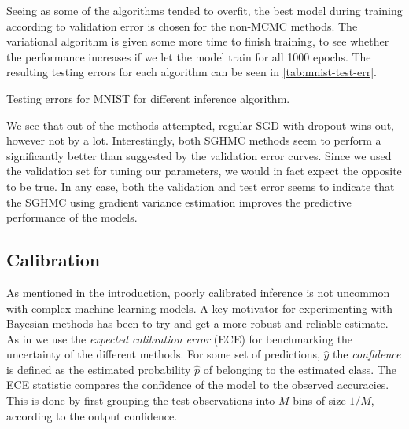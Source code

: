 Seeing as some of the algorithms tended to overfit, the best model during training according to validation error is chosen for the non-MCMC methods.
The variational algorithm is given some more time to finish training, to see whether the performance increases if we let the model train for all 1000 epochs. 
The resulting testing errors for each algorithm can be seen in \cref{tab:mnist-test-err}.
\begin{table}[htbp]
    \centering
    
    \caption{Testing errors for MNIST for different inference algorithm.}
    \label{tab:mnist-test-err}
\end{table}
We see that out of the methods attempted, regular SGD with dropout wins out, however not by a lot. 
Interestingly, both SGHMC methods seem to perform a significantly better than suggested by the validation error curves. 
Since we used the validation set for tuning our parameters, we would in fact expect the opposite to be true. 
In any case, both the validation and test error seems to indicate that the SGHMC using gradient variance estimation improves the predictive performance of the models.

\subsection{Calibration}

As mentioned in the introduction, poorly calibrated inference is not uncommon with complex machine learning models. 
A key motivator for experimenting with Bayesian methods has been to try and get a more robust and reliable estimate.
As in \cite{guo_calibration_2017} we use the \emph{expected calibration error} (ECE) for benchmarking the uncertainty of the different methods.
For some set of predictions, $\hat{y}$ the \emph{confidence} is defined as the estimated probability $\hat{p}$ of belonging to the estimated class.
The ECE statistic compares the confidence of the model to the observed accuracies.
This is done by first grouping the test observations into $M$ bins of size $1/M$, according to the output confidence. 

